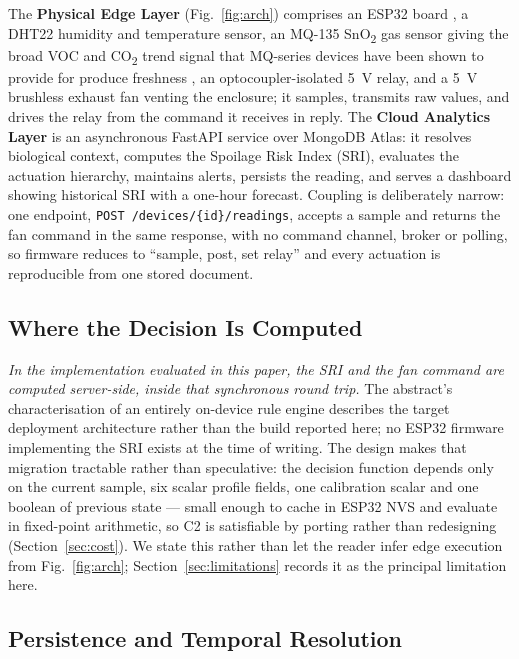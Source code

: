 \documentclass[conference]{IEEEtran}
\begin{document}
The \textbf{Physical Edge Layer} (Fig.~\ref{fig:arch}) comprises an ESP32
board \cite{samano2024}, a DHT22 humidity and temperature sensor, an
MQ-135 SnO\textsubscript{2} gas sensor giving the broad VOC and
CO\textsubscript{2} trend signal that MQ-series devices have been shown to
provide for produce freshness \cite{trebar2024,rahman2024}, an
optocoupler-isolated 5~V relay, and a 5~V brushless exhaust fan venting
the enclosure; it samples, transmits raw
values, and drives the relay from the command it receives in reply. The
\textbf{Cloud Analytics Layer} is an asynchronous FastAPI service over
MongoDB Atlas: it resolves biological context, computes the Spoilage Risk
Index (SRI), evaluates the actuation hierarchy, maintains alerts, persists
the reading, and serves a dashboard showing historical SRI with a one-hour
forecast. Coupling is deliberately narrow: one endpoint,
\texttt{POST /devices/\{id\}/readings}, accepts a sample and returns the
fan command in the same response, with no command channel, broker or
polling, so firmware reduces to ``sample, post, set relay'' and every
actuation is reproducible from one stored document.

\subsection{Where the Decision Is Computed}
\label{sec:where}

\emph{In the implementation evaluated in this paper, the SRI and the fan
command are computed server-side, inside that synchronous round trip.} The
abstract's characterisation of an entirely on-device rule engine describes
the target deployment architecture rather than the build reported here; no
ESP32 firmware implementing the SRI exists at the time of writing. The design
makes that migration tractable rather than speculative: the decision
function depends only on the current sample, six scalar profile fields,
one calibration scalar and one boolean of previous state --- small enough
to cache in ESP32 NVS and evaluate in fixed-point arithmetic, so C2 is
satisfiable by porting rather than redesigning (Section~\ref{sec:cost}).
We state this rather than let the reader infer edge execution from
Fig.~\ref{fig:arch}; Section~\ref{sec:limitations} records it as the
principal limitation here.

\subsection{Persistence and Temporal Resolution}
\end{document}
